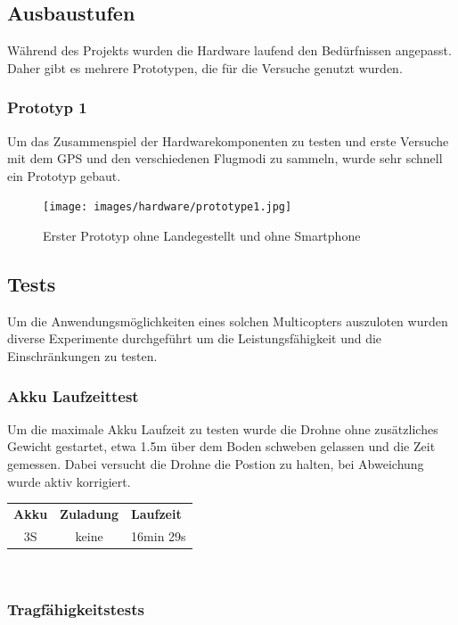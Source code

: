 \subsection{Ausbaustufen}

Während des Projekts wurden die Hardware laufend den Bedürfnissen angepasst. Daher gibt es mehrere Prototypen, die für die Versuche genutzt wurden.

\subsubsection{Prototyp 1}

Um das Zusammenspiel der Hardwarekomponenten zu testen und erste Versuche mit dem GPS und den verschiedenen Flugmodi zu sammeln, wurde sehr schnell ein Prototyp gebaut.

\begin{figure}[h]
	\centering
	\texttt{[image: images/hardware/prototype1.jpg]} 
	\caption{Erster Prototyp ohne Landegestellt und ohne Smartphone}
	\label{fig:prototyp-1}
\end{figure}

\subsection{Tests}

Um die Anwendungsmöglichkeiten eines solchen Multicopters auszuloten wurden diverse Experimente durchgeführt um die Leistungsfähigkeit und die Einschränkungen zu testen. 

\subsubsection{Akku Laufzeittest}
Um die maximale Akku Laufzeit zu testen wurde die Drohne ohne zusätzliches Gewicht gestartet, etwa 1.5m über dem Boden schweben gelassen und die Zeit gemessen. Dabei versucht die Drohne die Postion zu halten, bei Abweichung wurde aktiv korrigiert. \\

\begin{tabularx}{\textwidth}{|c|c|X}
    \hline
    \textbf{Akku} & \textbf{Zuladung}  & \textbf{Laufzeit} \\
    3S & keine & 16min 29s\\ \hline 
\end{tabularx}\\

\subsubsection{Tragfähigkeitstests}

